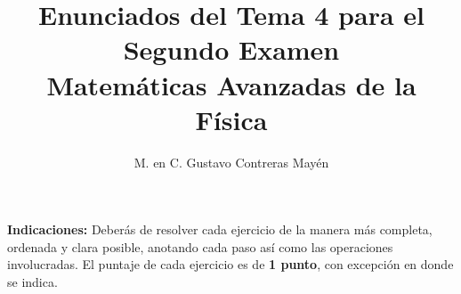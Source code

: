 
\title{Enunciados del Tema 4 para el Segundo Examen \\[0.3em]  \large{Matemáticas Avanzadas de la Física}\vspace{-3ex}}
\author{M. en C. Gustavo Contreras Mayén}
\date{ }

\vspace{-4cm}
\maketitle
\fontsize{14}{14}\selectfont

\textbf{Indicaciones: } Deberás de resolver cada ejercicio de la manera más completa, ordenada y clara posible, anotando cada paso así como las operaciones involucradas. El puntaje de cada ejercicio es de \textbf{1 punto}, con excepción en donde se indica.


